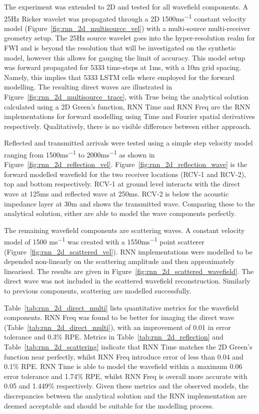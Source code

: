 The experiment was extended to 2D and tested for all wavefield components. A 25Hz Ricker wavelet was propagated through a 2D 1500\si{ms^{-1}} constant velocity model (Figure~\ref{fig:rnn_2d_multisource_vel}) with a multi-source multi-receiver geometry setup. The 25Hz source wavelet goes into the hyper-resolution realm for FWI and is beyond the resolution that will be investigated on the synthetic model, however this allows for gauging the limit of accuracy. This model setup was forward propagated for 5333 time-steps at 1ms, with a 10m grid spacing. Namely, this implies that 5333 LSTM cells where employed for the forward modelling. The resulting direct waves are illustrated in Figure~\ref{fig:rnn_2d_multisource_trace}, with True being the analytical solution calculated using a 2D Green’s function, RNN Time and RNN Freq are the RNN implementations for forward modelling using Time and Fourier spatial derivatives respectively. Qualitatively, there is no visible difference between either approach. 


Reflected and transmitted arrivals were tested using a simple step velocity model ranging from 1500\si{ms^{-1}} to 2000\si{ms^{-1}} as shown in Figure~\ref{fig:rnn_2d_reflection_vel}. Figure~\ref{fig:rnn_2d_reflection_wave} is the forward modelled wavefield for the two receiver locations (RCV-1 and RCV-2), top and bottom respectively. RCV-1 at ground level interacts with the direct wave at 125ms and reflected wave at 250ms. RCV-2 is below the acoustic impedance layer at 30m and shows the transmitted wave. Comparing these to the analytical solution, either are able to model the wave components perfectly.

The remaining wavefield components are scattering waves. A constant velocity model of 1500 \si{ms^{-1}} was created with a 1550\si{ms^{-1}} point scatterer (Figure~\ref{fig:rnn_2d_scattered_vel}). RNN implementations were modelled to be depended non-linearly on the scattering amplitude and then approximately linearised. The results are given in Figure~\ref{fig:rnn_2d_scattered_wavefield}. The direct wave was not included in the scattered wavefield reconstruction. Similarly to previous components, scattering are modelled successfully.

Table~\ref{tab:rnn_2d_direct_multi} lists quantitative metrics for the wavefield components. RNN Freq was found to be better for imaging the direct wave (Table~\ref{tab:rnn_2d_direct_multi}), with an improvement of 0.01 in error tolerance and 0.3\% \ac{RPE}. Metrics in Table~\ref{tab:rnn_2d_reflection} and Table~\ref{tab:rnn_2d_scattering} indicate that RNN Time matches the 2D Green’s function near perfectly, whilst RNN Freq introduce error of less than 0.04 and 0.1\% \ac{RPE}. RNN Time is able to model the wavefield within a maximum 0.06 error tolerance and 1.74\% RPE, whilst RNN Freq is overall more accurate with 0.05 and 1.449\% respectively. Given these metrics and the observed models, the discrepancies between the analytical solution and the RNN implementation are deemed acceptable and should be suitable for the modelling process.

